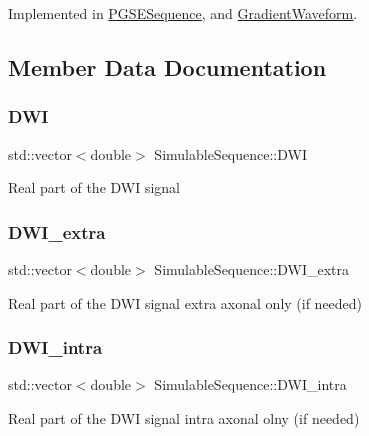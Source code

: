 Implemented in \hyperlink{class_p_g_s_e_sequence_a850a2f22cdf8b420888cfa906e03e078}{P\+G\+S\+E\+Sequence}, and \hyperlink{class_gradient_waveform_a2c606400c648cebd85827efa8d22b6bc}{Gradient\+Waveform}.



\subsection{Member Data Documentation}
\mbox{\label{class_simulable_sequence_a083961d839ed1433206ccbc481996409}} 
\subsubsection{\texorpdfstring{D\+WI}{DWI}}
{\footnotesize\ttfamily std\+::vector$<$double$>$ Simulable\+Sequence\+::\+D\+WI}

Real part of the D\+WI signal \mbox{\label{class_simulable_sequence_a49a24269e364bcd02000ba575acc85ed}} 
\subsubsection{\texorpdfstring{D\+W\+I\+\_\+extra}{DWI\_extra}}
{\footnotesize\ttfamily std\+::vector$<$double$>$ Simulable\+Sequence\+::\+D\+W\+I\+\_\+extra}

Real part of the D\+WI signal extra axonal only (if needed) \mbox{\label{class_simulable_sequence_ac64fb8110b769e180283365567bd4158}} 
\subsubsection{\texorpdfstring{D\+W\+I\+\_\+intra}{DWI\_intra}}
{\footnotesize\ttfamily std\+::vector$<$double$>$ Simulable\+Sequence\+::\+D\+W\+I\+\_\+intra}

Real part of the D\+WI signal intra axonal olny (if needed) \mbox{\label{class_simulable_sequence_a3708afa1322d72b59d3be20b740d107c}} 
